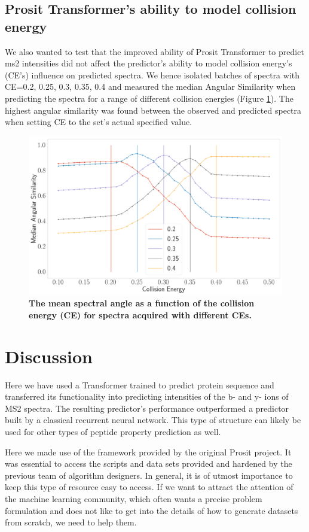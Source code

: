 \documentclass[10pt,a4paper]{article}
\begin{document}
\subsection*{Prosit Transformer’s ability to model collision energy}

We also wanted to test that the improved ability of Prosit Transformer to predict ms2 intensities did not affect the predictor’s ability to model collision energy’s (CE’s) influence on predicted spectra. We hence isolated batches of spectra with CE={0.2, 0.25, 0.3, 0.35, 0.4} and measured the median Angular Similarity when predicting the spectra for a range of different collision energies (Figure \ref{fig:ce}). The highest angular similarity was found between the observed and predicted spectra when setting CE to the set’s actual specified value.



\begin{figure}
\centering
\includegraphics[width=12cm]{./img/ce_calibration.png}
\caption{{\bf The mean spectral angle as a function of the collision energy (CE) for spectra acquired with different CEs.}\label{fig:ce}}
\end{figure}

\section*{Discussion}
Here we have used a Transformer trained to predict protein sequence and transferred its functionality into predicting intensities of the b- and y- ions of MS2 spectra. The resulting predictor’s performance outperformed a predictor built by a classical recurrent neural network. This type of structure can likely be used for other types of peptide property prediction as well.

Here we made use of the framework provided by the original Prosit project. It was essential to access the scripts and data sets provided and hardened by the previous team of algorithm designers. In general, it is of utmost importance to keep this type of resource easy to access. If we want to attract the attention of the machine learning community, which often wants a precise problem formulation and does not like to get into the details of how to generate datasets from scratch, we need to help them.
\end{document}
